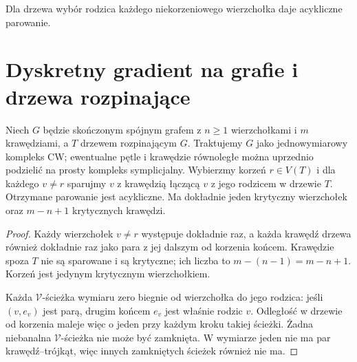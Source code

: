 \begin{samepage}
\begin{center}
\begin{minipage}{.96\linewidth}\centering
{}\par\smallskip

{\footnotesize Dla drzewa wybór rodzica każdego niekorzeniowego
wierzchołka daje acykliczne parowanie.}
\end{minipage}
\end{center}
\end{samepage}

\section{Dyskretny gradient na grafie i drzewa rozpinające}
\label{sec:tg-forman-on-graph}

\begin{twierdzenie}
\label{thm:tg-forman-tree}
Niech $G$ będzie skończonym spójnym grafem z $n\ge1$
wierzchołkami i $m$ krawędziami, a $T$ drzewem
rozpinającym $G$. Traktujemy $G$ jako jednowymiarowy
kompleks CW; ewentualne pętle i krawędzie równoległe
można uprzednio podzielić na prosty kompleks symplicjalny.
Wybierzmy korzeń $r\in V(T)$ i dla każdego $v\ne r$
sparujmy $v$ z krawędzią łączącą $v$ z jego rodzicem
w drzewie $T$. Otrzymane parowanie jest acykliczne.
Ma dokładnie jeden krytyczny wierzchołek oraz
$m-n+1$ krytycznych krawędzi.
\end{twierdzenie}

\begin{proof}
Każdy wierzchołek $v\ne r$ występuje dokładnie raz,
a każda krawędź drzewa również dokładnie raz jako
para z jej dalszym od korzenia końcem. Krawędzie
spoza $T$ nie są sparowane i są krytyczne; ich liczba
to $m-(n-1)=m-n+1$. Korzeń jest jedynym krytycznym
wierzchołkiem.

Każda $\mathcal V$-ścieżka wymiaru zero biegnie
od wierzchołka do jego rodzica: jeśli
$(v,e_v)$ jest parą, drugim końcem $e_v$ jest
właśnie rodzic $v$. Odległość w drzewie od korzenia
maleje więc o jeden przy każdym kroku takiej ścieżki.
Żadna niebanalna $\mathcal V$-ścieżka nie może być
zamknięta. W wymiarze jeden nie ma par krawędź--trójkąt,
więc innych zamkniętych ścieżek również nie ma.
\end{proof}

